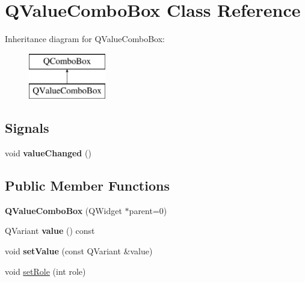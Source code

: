 \hypertarget{class_q_value_combo_box}{}\section{Q\+Value\+Combo\+Box Class Reference}
\label{class_q_value_combo_box}
Inheritance diagram for Q\+Value\+Combo\+Box\+:\begin{figure}[H]
\begin{center}
\leavevmode
\includegraphics[height=2.000000cm]{class_q_value_combo_box}
\end{center}
\end{figure}
\subsection*{Signals}
\begin{DoxyCompactItemize}
\item 
\mbox{\label{class_q_value_combo_box_a0b8f087567544541949baaad9e0626ed}} 
void {\bfseries value\+Changed} ()
\end{DoxyCompactItemize}
\subsection*{Public Member Functions}
\begin{DoxyCompactItemize}
\item 
\mbox{\label{class_q_value_combo_box_a7b0b30b9a341440940825a1655dc36dc}} 
{\bfseries Q\+Value\+Combo\+Box} (Q\+Widget $\ast$parent=0)
\item 
\mbox{\label{class_q_value_combo_box_a4ecb6352cec2cd8d33e8d0c67ce55f0f}} 
Q\+Variant {\bfseries value} () const
\item 
\mbox{\label{class_q_value_combo_box_af192c68c0c82f33000d8c1be8c013d2d}} 
void {\bfseries set\+Value} (const Q\+Variant \&value)
\item 
void \mbox{\hyperlink{class_q_value_combo_box_a9db5bc48951130e1104322de54f55471}{set\+Role}} (int role)
\end{DoxyCompactItemize}
